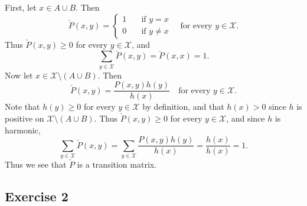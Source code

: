 \documentclass[12pt]{article}
\begin{document}
First, let $x \in A \cup B$. Then
\begin{equation*}
\check{P}(x, y) = \begin{cases}
1 & \quad \text{if $y = x$} \\
0 & \quad \text{if $y \neq x$}
\end{cases} \quad \text{for every $y \in \mathcal{X}$}.
\end{equation*}
Thus $\check{P}(x, y) \geq 0$ for every $y \in \mathcal{X}$, and
\begin{equation*}
\sum_{y \in \mathcal{X}} \check{P}(x, y) = \check{P}(x, x) = 1.
\end{equation*}
Now let $x \in \mathcal{X} \setminus (A \cup B)$. Then
\begin{equation*}
\check{P}(x, y) = \frac{P(x, y)h(y)}{h(x)} \quad \text{for every $y \in \mathcal{X}$}.
\end{equation*}
Note that $h(y) \geq 0$ for every $y \in \mathcal{X}$ by definition, and that $h(x) > 0$ since $h$ is positive on $\mathcal{X} \setminus (A \cup B)$. Thus $\check{P}(x, y) \geq 0$ for every $y \in \mathcal{X}$, and since $h$ is harmonic,
\begin{equation*}
\sum_{y \in \mathcal{X}} \check{P}(x, y) = \sum_{y \in \mathcal{X}} \frac{P(x, y)h(y)}{h(x)} = \frac{h(x)}{h(x)} = 1.
\end{equation*}
Thus we see that $\check{P}$ is a transition matrix.

\subsection*{Exercise 2}
\end{document}
